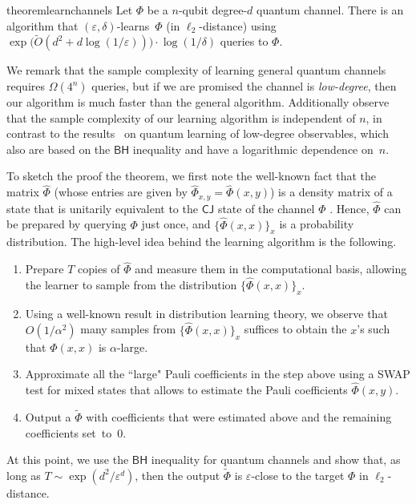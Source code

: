 \documentclass[11pt]{article}
\newcommand{\BH}{\textsf{BH}}
\newcommand{\CJ}{\textsf{CJ}}
\theoremstyle{plain}
\theoremstyle{plain}
\theoremstyle{definition}
\theoremstyle{remark}
\theoremstyle{named}
\begin{document}
\begin{restatable}{theorem}{learnchannels}\label{theo:learnchannels}
    Let $\Phi$ be a $n$-qubit degree-$d$ quantum channel. There is an algorithm that $(\varepsilon,
    \delta)$-learns~$\Phi$ (in $\ell_2$-distance)
    using 
    $ 
    \exp\big(\widetilde{O}(d^2+d\log (1/\varepsilon))\big)\cdot \log(1/\delta) 
    $ queries  
    to $\Phi$.
\end{restatable}
We remark that the sample complexity of learning general quantum channels requires $\Omega(4^n)$ queries, but if we are promised the channel is \emph{low-degree}, then our  algorithm is much faster than the general algorithm. Additionally  observe that the sample complexity of our learning algorithm is independent of $n$, in contrast to the results~\cite{huang2022learning, volberg2023noncommutative,slote2023bohnenblust,slote2023noncommutative,klein_et_al:LIPIcs.ITCS.2024.69} on quantum learning of low-degree observables, which also are based   on the $\BH$ inequality and have a logarithmic dependence on~$n$.

To sketch the proof the theorem, we first note the  well-known fact that the matrix $\widehat\Phi$ (whose entries are given by $\widehat{\Phi}_{x,y}=\widehat{\Phi}(x,y)$) is a density matrix of a state that is unitarily equivalent to the $\CJ$ state of the channel $\Phi$ \cite[Lemma 8]{bao2023nearly}. Hence, $\widehat\Phi$ can be prepared by querying $\Phi$ just once, and $\{\widehat\Phi(x,x)\}_{x}$ is a probability distribution. The high-level idea behind the learning algorithm is the following.
\begin{enumerate}
    \item Prepare $T$ copies of $\widehat\Phi$ and measure them in the computational basis, allowing the learner to sample from  the distribution $\{\widehat\Phi(x,x)\}_x$.
    \item Using a well-known result in distribution learning theory, we observe that $O(1/\alpha^2)$ many samples from $\{\widehat\Phi(x,x)\}_x$ suffices to obtain the $x$'s such that $\Phi(x,x)$ is $\alpha$-large.
    \item Approximate all the ``large" Pauli coefficients in the step above using a SWAP test for mixed states that allows to estimate the Pauli coefficients $\widehat\Phi(x,y)$. 
    \item Output a $\widetilde{\Phi}$ with coefficients that were estimated above and the remaining coefficients set~to~$0$.
\end{enumerate}
At this point, we use the $\BH$ inequality for quantum channels and show that, as long as $T\sim \exp(d^{2}/\varepsilon^d)$, then the output $\widetilde{\Phi}$ is $\varepsilon$-close to the target $\Phi$ in $\ell_2$-distance.
\end{document}
